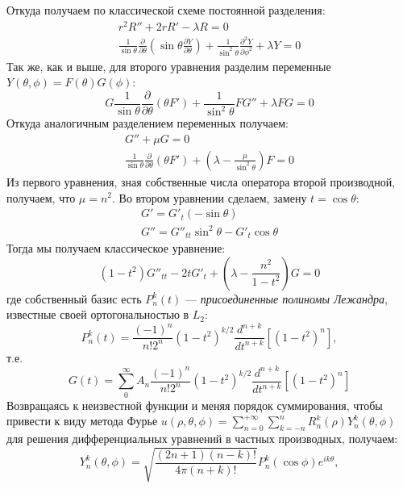Откуда получаем по классической схеме постоянной разделения:
\begin{align*}
r^2R''+2rR'-\lambda R =0 \\
\frac{1}{ \sin \theta} \frac{\partial}{\partial \theta }\left(\sin \theta \frac{\partial Y}{\partial \theta }\right)+\frac{1}{\sin^2 \theta } \frac{\partial^2 Y}{\partial \phi^2}+\lambda Y = 0
\end{align*}
Так же, как и выше, для второго уравнения разделим переменные $Y(\theta, \phi)=F(\theta)G(\phi)$:
\begin{equation*}
G\frac{1}{ \sin \theta} \frac{\partial}{\partial \theta }\left( \theta F'\right)+\frac{1}{\sin^2 \theta }FG''+\lambda FG = 0
\end{equation*}
Откуда аналогичным разделением переменных получаем:
\begin{align*}
G''+\mu G = 0 \\
\frac{1}{ \sin \theta} \frac{\partial}{\partial \theta }\left( \theta F'\right)+\left(\lambda - \frac{\mu}{\sin^2\theta}\right)F=0
\end{align*}
Из первого уравнения, зная собственные числа оператора второй производной, получаем, что $\mu=n^2$. Во втором уравнении сделаем, замену $t=\cos \theta$:
\begin{align*}
G'=G'_t(-\sin\theta) \\
G''=G''_{tt}\sin^2\theta -G'_t\cos\theta
\end{align*}
Тогда мы получаем классическое уравнение:
\begin{equation*}
(1-t^2)G''_{tt}-2tG'_t+\left(\lambda - \frac{n^2}{1-t^2}\right)G=0
\end{equation*}
где собственный базис есть $ P_{n}^{k}(t) $ --- \textit{присоединенные полиномы Лежандра}, известные своей ортогональностью в $ L_{2} $: \begin{equation*}
P_{n}^{k}(t)=\frac{(-1)^{n}}{n!2^{n}}(1-t^{2})^{k/2}\frac{d^{n+k}}{dt^{n+k}}[(1-t^{2})^{n}],
\end{equation*}
т.е. 
\begin{equation*}
G(t)=\sum\limits_0^\infty A_n \frac{(-1)^{n}}{n!2^{n}}(1-t^{2})^{k/2}\frac{d^{n+k}}{dt^{n+k}}[(1-t^{2})^{n}]
\end{equation*}
Возвращаясь к неизвестной функции и меняя порядок суммирования, чтобы привести к виду метода Фурье $ u(\rho,\theta,\phi)=\sum\limits _{n=0}^{+\infty}\sum\limits _{k=-n}^{n}R_{n}^{k}(\rho)Y_{n}^{k}(\theta,\phi) $ для решения дифференциальных уравнений в частных производных, получаем: \begin{equation*}
Y_{n}^{k}(\theta,\phi)=\sqrt{\frac{(2n+1)(n-k)!}{4\pi(n+k)!}}P_{n}^{k}(\cos\phi)e^{ik\theta},
\end{equation*}
